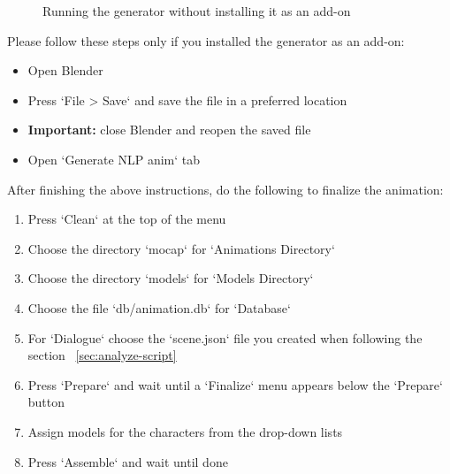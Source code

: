 \begin{figure}[H]
	\centerline{}
	\caption{Running the generator without installing it as an add-on}\label{fig:withoutaddon}
\end{figure}

Please follow these steps only if you installed the generator as an add-on:
\begin{itemize}
	\item Open Blender
	\item Press `File > Save` and save the file in a preferred location
	\item \textbf{Important:} close Blender and reopen the saved file
	\item Open `Generate NLP anim` tab
\end{itemize}

\noindent After finishing the above instructions, do the following to finalize the animation:
\begin{enumerate}
	\item Press `Clean` at the top of the menu
	\item Choose the directory `mocap` for `Animations Directory`
	\item Choose the directory `models` for `Models Directory`
	\item Choose the file `db/animation.db` for `Database`
	\item For `Dialogue` choose the `scene.json` file you created when following the section ~\ref{sec:analyze-script}
	\item Press `Prepare` and wait until a `Finalize` menu appears below the `Prepare` button
	\item Assign models for the characters from the drop-down lists
	\item Press `Assemble` and wait until done
\end{enumerate}

